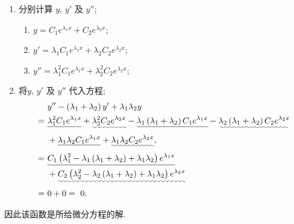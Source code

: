 \documentclass[answer]{THUExam}
\begin{document}
\begin{solution}
    \begin{enumerate}
        \item 分别计算 $y$, $y'$ 及 $y''$;
              \begin{enumerate}
                  \item $y=C_1 e^{\lambda_1 x}+C_2 e^{\lambda_2 x}$;
                  \item $y'=\lambda_1C_1  e^{\lambda_1 x}+\lambda_2 C_2 e^{\lambda_2 x}$;
                  \item $y''= \lambda_1^2 C_1e^{\lambda_1 x}+\lambda_2^2 C_2 e^{\lambda_2 x}$;
              \end{enumerate}
        \item 将$y$, $y'$ 及 $y''$ 代入方程;
              $$
                  \begin{aligned}
                        & \,\,y^{\prime \prime}-\left(\lambda_1+\lambda_2\right) y^{\prime}+\lambda_1 \lambda_2 y                                                                                                                                          \\
                      = & \,\, \uline{\lambda_1^2 C_1 e^{\lambda_1 x}}+\uwave{\lambda_2^2 C_2 e^{\lambda_2 x}}-\uline{\lambda_1\left(\lambda_1+\lambda_2\right) C_1 e^{\lambda_1 x}}-\uwave{\lambda_2\left(\lambda_1+\lambda_2\right) C_2 e^{\lambda_2 x}} \\
                        & \,\,+ \uline{\lambda_1 \lambda_2 C_1 e^{\lambda_1 x}}+\uwave{\lambda_1 \lambda_2 C_2 e^{\lambda_2 x}},                                                                                                                           \\
                      = & \,\, \uline{C_1 \left(\lambda_1^2 -\lambda_1\left(\lambda_1+\lambda_2\right) + \lambda_1 \lambda_2 \right)  e^{\lambda_1 x}}                                                                                                     \\
                        & \,\,+\uwave{C_2 \left(\lambda_2^2 -\lambda_2\left(\lambda_1+\lambda_2\right) + \lambda_1 \lambda_2 \right)  e^{\lambda_2 x}}                                                                                                     \\
                      = & \,\,0+0=\,\,0.
                  \end{aligned}
              $$
    \end{enumerate}
    因此该函数是所给微分方程的解.
\end{solution}
\bigskip
\end{document}
